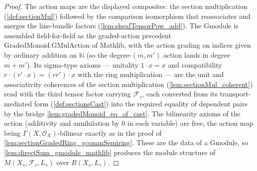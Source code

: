 \begin{proof}
  The action maps are the displayed composites: the section multiplication
  (\cref{def:sectionMul}) followed by the comparison isomorphism that reassociates
  and merges the line-bundle factors (\cref{lem:sheafTensorPow_add}). The
  \(\mathrm{Gmodule}\) is assembled field-for-field as the graded-action precedent
  \(\mathrm{GradedMonoid.GMulAction}\) of Mathlib, with the action grading on
  indices given by ordinary addition on \(\mathbb{N}\) (so the degree-\((m,m')\)
  action lands in degree \(m+m'\)). Its sigma-type axioms --- unitality
  \(1 \cdot x = x\) and compatibility
  \(r \cdot (r' \cdot x) = (r r') \cdot x\) with the ring multiplication --- are
  the unit and associativity coherences of the section multiplication
  (\cref{lem:sectionMul_coherent}) read with the third tensor factor carrying
  \(\mathcal{F}_s\), each converted from its transport-mediated form
  (\cref{def:sectionsCast}) into the required equality of dependent pairs by the
  bridge \cref{lem:gradedMonoid_eq_of_cast}. The bilinearity axioms of the action
  (additivity and annihilation by \(0\) in each variable) are free, the action map
  being \(\Gamma(X,\mathcal{O}_X)\)-bilinear exactly as in the proof of
  \cref{lem:sectionGradedRing_gcommSemiring}. These are the data of a
  \(\mathrm{Gmodule}\), so \cref{lem:directSum_gmodule_mathlib} produces the module
  structure of \(M(X_s, \mathcal{F}_s, L_s)\) over \(R(X_s, L_s)\).
\end{proof}
